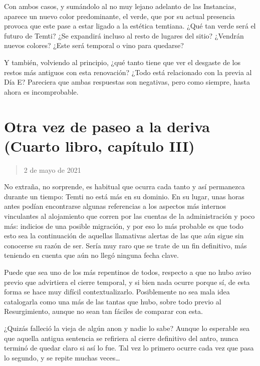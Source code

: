 \documentclass[
]{book}
\begin{document}
Con ambos casos, y sumándolo al no muy lejano adelanto de las Instancias, aparece un nuevo color predominante, el verde, que por su actual presencia provoca que este pase a estar ligado a la estética temtiana. ¿Qué tan verde será el futuro de Temti? ¿Se expandirá incluso al resto de lugares del sitio? ¿Vendrán nuevos colores? ¿Este será temporal o vino para quedarse?

Y también, volviendo al principio, ¿qué tanto tiene que ver el desgaste de los restos más antiguos con esta renovación? ¿Todo está relacionado con la previa al Día E? Pareciera que ambas respuestas son negativas, pero como siempre, hasta ahora es incomprobable.

\hypertarget{otra-vez-de-paseo-a-la-deriva-cuarto-libro-capuxedtulo-iii}{%
\section{Otra vez de paseo a la deriva (Cuarto libro, capítulo III)}\label{otra-vez-de-paseo-a-la-deriva-cuarto-libro-capuxedtulo-iii}}

\begin{quote}
2 de mayo de 2021
\end{quote}

No extraña, no sorprende, es habitual que ocurra cada tanto y así permanezca durante un tiempo: Temti no está más en su dominio. En su lugar, unas horas antes podían encontrarse algunas referencias a los aspectos más internos vinculantes al alojamiento que corren por las cuentas de la administración y poco más: indicios de una posible migración, y por eso lo más probable es que todo esto sea la continuación de aquellas llamativas alertas de las que aún sigue sin conocerse su razón de ser. Sería muy raro que se trate de un fin definitivo, más teniendo en cuenta que aún no llegó ninguna fecha clave.

Puede que sea uno de los más repentinos de todos, respecto a que no hubo aviso previo que advirtiera el cierre temporal, y si bien nada ocurre porque sí, de esta forma se hace muy difícil contextualizarlo. Posiblemente no sea mala idea catalogarla como una más de las tantas que hubo, sobre todo previo al Resurgimiento, aunque no sean tan fáciles de comparar con esta.

¿Quizás falleció la vieja de algún anon y nadie lo sabe? Aunque lo esperable sea que aquella antigua sentencia se refiriera al cierre definitivo del antro, nunca terminó de quedar claro si así lo fue. Tal vez lo primero ocurre cada vez que pasa lo segundo, y se repite muchas veces\ldots{}
\end{document}
